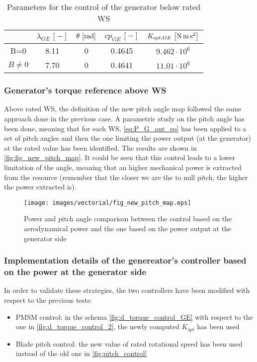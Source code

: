 \begin{table}[htb]
  \centering
  \caption{Parameters for the control of the generator below rated WS}
  \begin{tabular}{ccccc}
    \toprule
    & $\lambda_{GE} \, \left[-\right]$ & $\theta \, \left[\si{\radian}\right]$ & $cp_{GE} \, \left[-\right]$ & $K_{opt,GE} \, \left[\si{\newton\meter\square\second}\right]$ \\ \midrule
    B=0 & 8.11 & 0 & 0.4645 & $9.462 \cdot 10^6$\\
    $B\ne0$ & 7.70 & 0 & 0.4641 & $11.01 \cdot 10^6$\\ \bottomrule
  \end{tabular}
  \label{tab:tab_k_opt_GE}
\end{table}

\subsubsection{Generator's torque reference above WS}
Above rated WS, the definition of the new pitch angle map followed the same approach done in the previous case. A parametric study on the pitch angle has been done, meaning that for each WS, \autoref{eq:P_G_out_eq} has been applied to a set of pitch angles and then the one limiting the power output (at the generator) at the rated value has been identified. The results are shown in \autoref{fig:fig_new_pitch_map}. It could be seen that this control leads to a lower limitation of the angle, meaning that an higher mechanical power is extracted from the resource (remember that the closer we are the to null pitch, the higher the power extracted is).
\begin{figure}[htb]
  \centering
  \texttt{[image: images/vectorial/fig\_new\_pitch\_map.eps]}
  \caption{Power and pitch angle comparison between the control based on the aerodynamical power and the one based on the power output at the generator side}
  \label{fig:fig_new_pitch_map}
\end{figure}

\subsubsection{Implementation details of the genereator's controller based on the power at the generator side}
In order to validate these strategies, the two controllers have been modified with respect to the previous tests:
\begin{itemize}
  \item PMSM control: in the schema \autoref{fig:d_torque_control_GE} with respect to the one in \autoref{fig:d_torque_control_2}, the newly computed  $K_{opt}$ has been used%
  \item Blade pitch control: the new value of rated rotational speed has been used instead of the old one in \autoref{fig:pitch_control}
\end{itemize}


